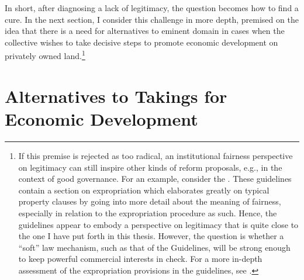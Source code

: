 In short, after diagnosing a lack of legitimacy, the question becomes how to find a cure. In the next section, I consider this challenge in more depth, premised on the idea that there is a need for alternatives to eminent domain in cases when the collective wishes to take decisive steps to promote economic development on privately owned land.\footnote{If this premise is rejected as too radical, an institutional fairness perspective on legitimacy can still inspire other kinds of reform proposals, e.g., in the context of good governance. For an example, consider the \cite{guide12}. These guidelines contain a section on expropriation which elaborates greatly on typical property clauses by going into more detail about the meaning of fairness, especially in relation to the expropriation procedure as such. Hence, the guidelines appear to embody a perspective on legitimacy that is quite close to the one I have put forth in this thesis. However, the question is whether a ``soft'' law mechanism, such as that of the Guidelines, will be strong enough to keep powerful commercial interests in check. For a more in-depth assessment of the expropriation provisions in the guidelines, see \cite{hoops15}.}

\section{Alternatives to Takings for Economic Development}\label{sec:3:6}

